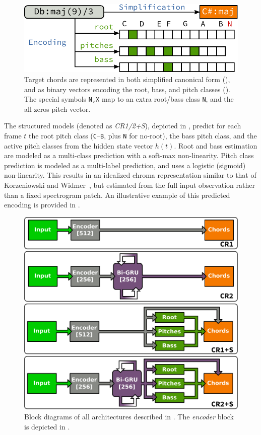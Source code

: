 \documentclass{article}
\begin{document}
\begin{figure}[t]
    \centering
    \includegraphics[width=0.85\columnwidth]{encoding}
    \caption{Target chords are represented in both simplified canonical form (), and as binary vectors encoding the root, bass, and pitch classes ().
    The special symbols \texttt{N,X} map to an extra root/bass class \texttt{N}, and the all-zeros pitch vector.\label{fig:encoding}}
\end{figure}

The structured models (denoted as \emph{CR1/2+S}), depicted in , predict for each frame $t$ the root pitch class (\texttt{C}--\texttt{B}, plus \texttt{N} for no-root), the bass pitch class, and the active pitch classes from the hidden state vector $h(t)$.
Root and bass estimation are modeled as a multi-class prediction with a soft-max non-linearity.
Pitch class prediction is modeled as a multi-label prediction, and uses a logistic (sigmoid) non-linearity.
This results in an idealized chroma representation similar to that of Korzeniowski and Widmer~\cite{korzeniowski2016feature}, but estimated from the full input observation rather than a fixed spectrogram patch.
An illustrative example of this predicted encoding is provided in .

\begin{figure}[t]
    \centering
    \includegraphics[width=0.8\columnwidth]{architectures}
    \caption{Block diagrams of all architectures described in .
    The \emph{encoder} block is depicted in .\label{fig:architectures}}
\end{figure}
\end{document}
